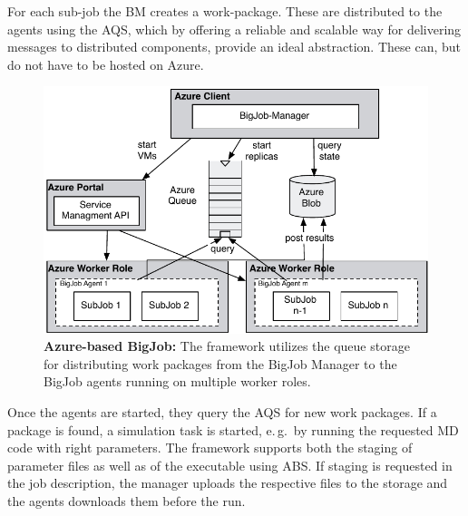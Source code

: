 \documentclass[conference,final]{IEEEtran}
\newcommand{\up}{\vspace*{-1em}}
\newcommand{\alnote}[1]{ {\textcolor{blue} { ***AL: #1 }}}
\newcommand{\jhanote}[1]{ {\textcolor{red} { ***SJ: #1 }}}
\newcommand{\alnote}[1]{}
\newcommand{\jhanote}[1]{}
\begin{document}
For each sub-job the BM creates a work-package. These are distributed
to the agents using the AQS, which by offering a reliable and scalable
way for delivering messages to distributed components, provide an
ideal abstraction. These can, but do not have to be hosted on Azure.






\begin{figure}
    \centering
    \includegraphics[width=.4\textwidth]{figures/bigjob_azure}
    \caption{\textbf{Azure-based BigJob:} The framework
      utilizes the queue storage for distributing work
      packages from the BigJob Manager to the
      BigJob agents running on multiple worker roles.}
    \label{fig:figures_bigjob_azure}
    \up\up
\end{figure}

Once the agents are started, they query the AQS for new work packages.
If a package is found, a simulation task is started, e.\,g.\ by
running the requested MD code with right parameters. The framework
supports both the staging of parameter files as well as of the
executable using ABS. If staging is requested in the job description, 
the manager uploads the respective files
to the storage and the agents downloads them before the run.
\end{document}

